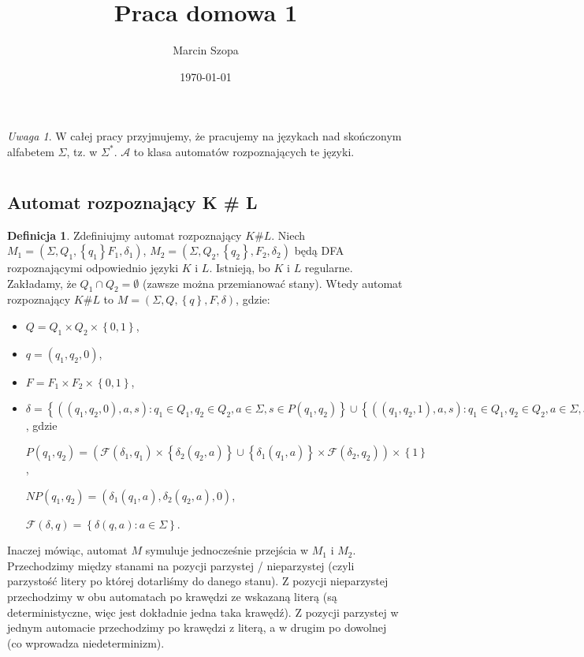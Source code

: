 \documentclass{article}
\title{Praca domowa 1}
\author{Marcin Szopa}
\date{\today}
\theoremstyle{definition}
\newtheorem{definition}{Definicja}[section]
\theoremstyle{remark}
\newtheorem*{remark}{Uwaga}
\newcommand{\singleton}[1]{\left\{ #1 \right\}}
\begin{document}
\maketitle

\begin{remark}
    W całej pracy przyjmujemy, że pracujemy na językach nad skończonym alfabetem \(\Sigma\), tz. w \( \Sigma^* \). \(\mathcal{A}\) to klasa automatów rozpoznających te języki.
\end{remark}

\section{}

\subsection{Automat rozpoznający K \# L}

\begin{definition}

Zdefiniujmy automat rozpoznający \(K \# L\).
Niech \(M_1 = (\Sigma, Q_1, \singleton{q_1} F_1, \delta_1)\), \(M_2 = (\Sigma, Q_2, \singleton{q_2}, F_2, \delta_2)\)
będą DFA rozpoznającymi odpowiednio języki \(K\) i \(L\). Istnieją, bo \(K\) i \(L\) regularne. Zakładamy, że \(Q_1 \cap Q_2 = \emptyset\) (zawsze można przemianować stany). Wtedy automat rozpoznający \(K \# L\) to
\(M = (\Sigma, Q, \singleton{q}, F, \delta)\), gdzie:

\begin{itemize}
    \item \(Q = Q_1 \times Q_2 \times \left\{ 0, 1 \right\}\),
    \item \(q = (q_1, q_2, 0)\),
    \item \(F = F_1 \times F_2 \times \left\{ 0, 1 \right\} \),
    \item \(\delta = \left\{ \left( \left(q_1, q_2, 0 \right), a, s \right): q_1 \in Q_1, q_2 \in Q_2, a \in \Sigma, s \in P(q_1, q_2) \right\}
    \cup \left\{ \left( \left(q_1, q_2, 1 \right), a, s\right): q_1 \in Q_1, q_2 \in Q_2, a \in \Sigma, s \in NP(q_1, q_2) \right\} \), gdzie

    \(P(q_1, q_2) = \left( \mathcal{F}(\delta_1, q_1) \times \singleton{\delta_2(q_2,a)}
    \cup \singleton{\delta_1(q_1,a)} \times \mathcal{F}(\delta_2, q_2) \right) \times \singleton{1}\),

    \(NP(q_1, q_2) =  \left( \delta_1(q_1,a), \delta_2(q_2,a), 0 \right)\),

    \(\mathcal{F}(\delta, q) = \left\{ \delta(q, a): a \in \Sigma \right\}\).
\end{itemize}

Inaczej mówiąc, automat \(M\) symuluje jednocześnie przejścia w \(M_1\) i \(M_2\).
Przechodzimy między stanami na pozycji parzystej / nieparzystej (czyli parzystość litery po której dotarliśmy do danego stanu).
Z pozycji nieparzystej przechodzimy w obu automatach po krawędzi ze wskazaną literą (są deterministyczne, więc jest dokładnie jedna taka krawędź).
Z pozycji parzystej w jednym automacie przechodzimy po krawędzi z literą, a w drugim po dowolnej (co wprowadza niedeterminizm).
\end{definition}
\end{document}
